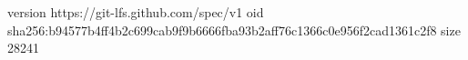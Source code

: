 version https://git-lfs.github.com/spec/v1
oid sha256:b94577b4ff4b2c699cab9f9b6666fba93b2aff76c1366c0e956f2cad1361c2f8
size 28241
